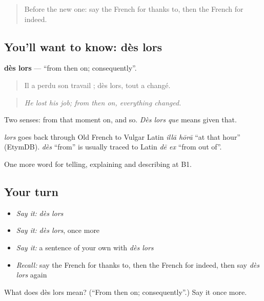 \begin{quote}
Before the new one: say the French for thanks to, then the French for indeed.
\end{quote}

\subsection*{You'll want to know: dès lors}
\textbf{dès lors} — \textquotedblleft{}from then on; consequently\textquotedblright{}.

\begin{quote}
Il a perdu son travail ; dès lors, tout a changé.
\end{quote}

\begin{quote}
\emph{He lost his job; from then on, everything changed.}
\end{quote}

Two senses: from that moment on, and so. \emph{Dès lors que} means given that.

\begin{cousinweb}
\emph{lors} goes back through Old French to Vulgar Latin \emph{illā hōrā} \textquotedblleft{}at that hour\textquotedblright{} (EtymDB). \emph{dès} \textquotedblleft{}from\textquotedblright{} is usually traced to Latin \emph{dē ex} \textquotedblleft{}from out of\textquotedblright{}.
\end{cousinweb}

\begin{grammarlens}[title={What you've built}]
One more word for telling, explaining and describing at B1.
\end{grammarlens}

\subsection*{Your turn}
\begin{itemize}
\raggedright
  \item \emph{Say it:} \emph{dès lors}
  \item \emph{Say it:} \emph{dès lors}, once more
  \item \emph{Say it:} a sentence of your own with \emph{dès lors}
  \item \emph{Recall:} say the French for thanks to, then the French for indeed, then say \emph{dès lors} again
\end{itemize}

\begin{tcolorbox}[breakable,colback=teal!4,colframe=teal!35!black,title={Before you move on}]
What does dès lors mean? (\textquotedblleft{}From then on; consequently\textquotedblright{}.) Say it once more.
\end{tcolorbox}
